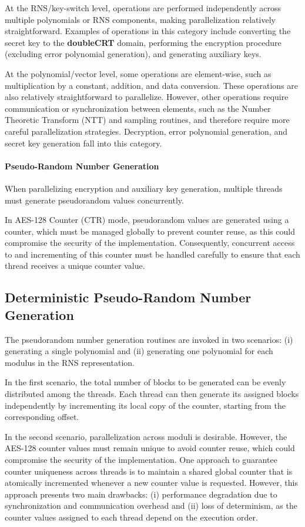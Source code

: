 At the RNS/key-switch level, operations are performed independently across multiple polynomials or RNS components, making parallelization relatively straightforward. Examples of operations in this category include converting the secret key to the \textbf{doubleCRT} domain, performing the encryption procedure (excluding error polynomial generation), and generating auxiliary keys.

At the polynomial/vector level, some operations are element-wise, such as multiplication by a constant, addition, and data conversion. These operations are also relatively straightforward to parallelize. However, other operations require communication or synchronization between elements, such as the Number Theoretic Transform (NTT) and sampling routines, and therefore require more careful parallelization strategies. Decryption, error polynomial generation, and secret key generation fall into this category.

\paragraph{Pseudo-Random Number Generation}

When parallelizing encryption and auxiliary key generation, multiple threads must generate pseudorandom values concurrently.

In AES-128 Counter (CTR) mode, pseudorandom values are generated using a counter, which must be managed globally to prevent counter reuse, as this could compromise the security of the implementation. Consequently, concurrent access to and incrementing of this counter must be handled carefully to ensure that each thread receives a unique counter value.

\subsection{Deterministic Pseudo-Random Number Generation}

The pseudorandom number generation routines are invoked in two scenarios: (i) generating a single polynomial and (ii) generating one polynomial for each modulus in the RNS representation.

In the first scenario, the total number of blocks to be generated can be evenly distributed among the threads. Each thread can then generate its assigned blocks independently by incrementing its local copy of the counter, starting from the corresponding offset.

In the second scenario, parallelization across moduli is desirable. However, the AES-128 counter values must remain unique to avoid counter reuse, which could compromise the security of the implementation. One approach to guarantee counter uniqueness across threads is to maintain a shared global counter that is atomically incremented whenever a new counter value is requested. However, this approach presents two main drawbacks: (i) performance degradation due to synchronization and communication overhead and (ii) loss of determinism, as the counter values assigned to each thread depend on the execution order.

